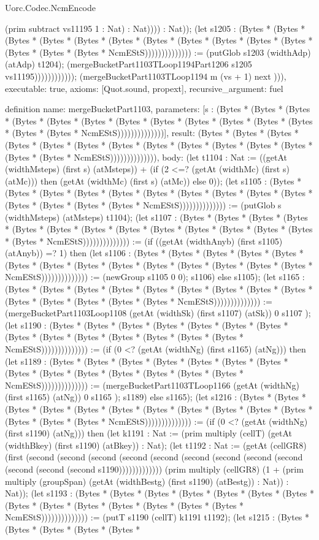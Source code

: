 \begin{lexlean}{Uorc.Codec.NcmEncode}
\begin{semanticmodule}
{(prim subtract vs11195 1 : Nat) : Nat)))) : Nat)); (let s1205 : (Bytes * (Bytes * (Bytes * (Bytes * (Bytes * (Bytes * (Bytes * (Bytes * (Bytes * (Bytes * (Bytes * (Bytes * (Bytes * (Bytes * NcmEStS)))))))))))))) := (putGlob s1203 (widthAdp) (atAdp) t1204); (mergeBucketPart1103TLoop1194Part1206 s1205 vs11195)))))))))))); (mergeBucketPart1103TLoop1194 m (vs + 1) next ))),
  executable: true,
  axioms: [Quot.sound, propext],
  recursive_argument: fuel
}

definition{
  name: mergeBucketPart1103,
  parameters: [s : (Bytes * (Bytes * (Bytes * (Bytes * (Bytes * (Bytes * (Bytes * (Bytes * (Bytes * (Bytes * (Bytes * (Bytes * (Bytes * (Bytes * NcmEStS))))))))))))))],
  result: (Bytes * (Bytes * (Bytes * (Bytes * (Bytes * (Bytes * (Bytes * (Bytes * (Bytes * (Bytes * (Bytes * (Bytes * (Bytes * (Bytes * NcmEStS)))))))))))))),
  body: (let t1104 : Nat := ((getAt (widthMsteps) (first s) (atMsteps)) + (if (2 <=? (getAt (widthMc) (first s) (atMc))) then (getAt (widthMc) (first s) (atMc)) else 0)); (let s1105 : (Bytes * (Bytes * (Bytes * (Bytes * (Bytes * (Bytes * (Bytes * (Bytes * (Bytes * (Bytes * (Bytes * (Bytes * (Bytes * (Bytes * NcmEStS)))))))))))))) := (putGlob s (widthMsteps) (atMsteps) t1104); (let s1107 : (Bytes * (Bytes * (Bytes * (Bytes * (Bytes * (Bytes * (Bytes * (Bytes * (Bytes * (Bytes * (Bytes * (Bytes * (Bytes * (Bytes * NcmEStS)))))))))))))) := (if ((getAt (widthAnyb) (first s1105) (atAnyb)) =? 1) then (let s1106 : (Bytes * (Bytes * (Bytes * (Bytes * (Bytes * (Bytes * (Bytes * (Bytes * (Bytes * (Bytes * (Bytes * (Bytes * (Bytes * (Bytes * NcmEStS)))))))))))))) := (newGroup s1105 0 0); s1106) else s1105); (let s1165 : (Bytes * (Bytes * (Bytes * (Bytes * (Bytes * (Bytes * (Bytes * (Bytes * (Bytes * (Bytes * (Bytes * (Bytes * (Bytes * (Bytes * NcmEStS)))))))))))))) := (mergeBucketPart1103Loop1108 (getAt (widthSk) (first s1107) (atSk)) 0 s1107 ); (let s1190 : (Bytes * (Bytes * (Bytes * (Bytes * (Bytes * (Bytes * (Bytes * (Bytes * (Bytes * (Bytes * (Bytes * (Bytes * (Bytes * (Bytes * NcmEStS)))))))))))))) := (if (0 <? (getAt (widthNg) (first s1165) (atNg))) then (let s1189 : (Bytes * (Bytes * (Bytes * (Bytes * (Bytes * (Bytes * (Bytes * (Bytes * (Bytes * (Bytes * (Bytes * (Bytes * (Bytes * (Bytes * NcmEStS)))))))))))))) := (mergeBucketPart1103TLoop1166 (getAt (widthNg) (first s1165) (atNg)) 0 s1165 ); s1189) else s1165); (let s1216 : (Bytes * (Bytes * (Bytes * (Bytes * (Bytes * (Bytes * (Bytes * (Bytes * (Bytes * (Bytes * (Bytes * (Bytes * (Bytes * (Bytes * NcmEStS)))))))))))))) := (if (0 <? (getAt (widthNg) (first s1190) (atNg))) then (let k1191 : Nat := (prim multiply (cellT) (getAt (widthBkey) (first s1190) (atBkey)) : Nat); (let t1192 : Nat := (getAt (cellGR8) (first (second (second (second (second (second (second (second (second (second (second (second (second s1190))))))))))))) (prim multiply (cellGR8) (1 + (prim multiply (groupSpan) (getAt (widthBestg) (first s1190) (atBestg)) : Nat)) : Nat)); (let s1193 : (Bytes * (Bytes * (Bytes * (Bytes * (Bytes * (Bytes * (Bytes * (Bytes * (Bytes * (Bytes * (Bytes * (Bytes * (Bytes * (Bytes * NcmEStS)))))))))))))) := (putT s1190 (cellT) k1191 t1192); (let s1215 : (Bytes * (Bytes * (Bytes * (Bytes * (Bytes * }
\end{semanticmodule}
\end{lexlean}
